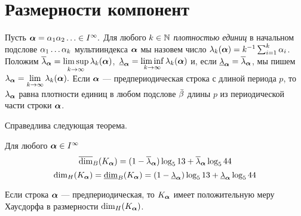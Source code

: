 \section{Размерности компонент}

Пусть ${\bm{\alpha}}=\alpha_1 \alpha_2 \ldots\in I^\infty.$ 
Для любого $k \in\mathbb{N}$ {\em плотностью единиц} в начальном подслове $\alpha_{1}\ldots\alpha_{k}$ мультииндекса ${\bm{\alpha}}$ мы назовем число $\lambda_{k}({\bm{\alpha}})=k^{-1}\sum_{i=1}^k\alpha_i$. 
Положим $\overline{\lambda}_{\bm{\alpha}}=\limsup\limits_{k\to\infty}{\lambda_{k}({\bm{\alpha}})}$,\ $\underline{\lambda}_{\bm{\alpha}}=\liminf\limits_{k\to\infty}{\lambda_{k}({\bm{\alpha}})}$ и, если $\underline{\lambda}_{\bm{\alpha}}=\overline{\lambda}_{\bm{\alpha}}$, мы пишем $\lambda_{\bm{\alpha}}=\lim\limits_{k\to\infty}{\lambda_{k}({\bm{\alpha}})}.$
 Если ${\bm{\alpha}}$ --- предпериодическая строка с длиной периода $p$, то $\lambda_{\bm{\alpha}}$ равна плотности единиц в любом подслове $\bar{\beta}$ длины $p$ из периодической части строки ${\bm{\alpha}}$.\smallskip

Справедлива  следующая  теорема.
\begin{theorem}\label{tdim}
Для любого ${\bm{\alpha}}\in I^\infty$
$$\overline{\dim}_B(K_{\bm{\alpha}})=(1-\overline{\lambda}_{\bm{\alpha}})\log_513+\overline{\lambda}_{\bm{\alpha}}\log_544$$
$$\dim_H(K_{\bm{\alpha}})=\underline{\dim}_B(K_{\bm{\alpha}})=(1-\underline{\lambda}_{\bm{\alpha}})\log_513+\underline{\lambda}_{\bm{\alpha}}\log_544$$

Если строка ${\bm{\alpha}}$ --- предпериодическая, то $K_{\bm{\alpha}}$ имеет положительную меру Хаусдорфа в размерности $\dim_H(K_{\bm{\alpha}})$.
\end{theorem}

